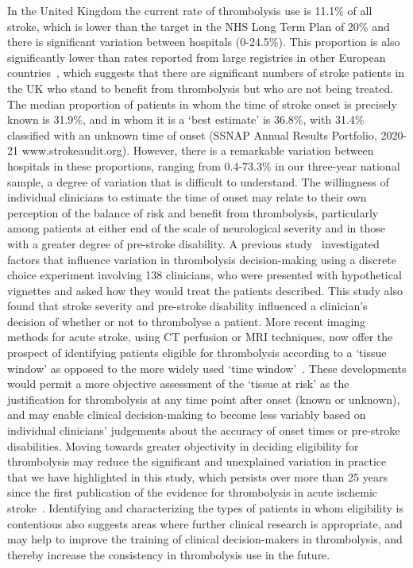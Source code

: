 \documentclass[12pt,a4paper, pdftex]{elsarticle}
\begin{document}
In the United Kingdom the current rate of thrombolysis use is 11.1\% of all stroke, which is lower than the target in the NHS Long Term Plan of 20\% and there is significant variation between hospitals (0-24.5\%).  This proportion is also significantly lower than rates reported from large registries in other European countries~\cite{kuhrij2018dutch}, which suggests that there are significant numbers of stroke patients in the UK who stand to benefit from thrombolysis but who are not being treated. The median proportion of patients in whom the time of stroke onset is precisely known is 31.9\%, and in whom it is a ‘best estimate’ is 36.8\%, with 31.4\% classified with an unknown time of onset (SSNAP Annual Results Portfolio, 2020-21 www.strokeaudit.org). However, there is a remarkable variation between hospitals in these proportions, ranging from  0.4-73.3\% in our three-year national sample, a degree of variation that is difficult to understand.  The willingness of individual clinicians to estimate the time of onset may relate to their own perception of the balance of risk and benefit from thrombolysis, particularly among patients at either end of the scale of neurological severity and in those with a greater degree of pre-stroke disability.  
%
A previous study~\cite{de2018factors} investigated factors that influence variation in thrombolysis decision-making using a discrete choice experiment involving 138 clinicians, who were presented with hypothetical vignettes and asked how they would treat the patients described. This study also found that stroke severity and pre-stroke disability influenced a clinician’s decision of whether or not to thrombolyse a patient. More recent imaging methods for acute stroke, using CT perfusion or MRI techniques, now offer the prospect of identifying patients eligible for thrombolysis according to a ‘tissue window’ as opposed to the more widely used ‘time window’~\cite{thomalla2020intravenous}. These developments would permit a more objective assessment of the ‘tissue at risk’ as the justification for thrombolysis at any time point after onset (known or unknown), and may enable clinical decision-making to become less variably based on individual clinicians’ judgements about the accuracy of onset times or pre-stroke disabilities.  Moving towards greater objectivity in deciding eligibility for thrombolysis may reduce the significant and unexplained variation in practice that we have highlighted in this study, which persists over more than 25 years since the first publication of the evidence for thrombolysis in acute ischemic stroke~\cite{tissue1995national}. Identifying and characterizing the types of patients in whom eligibility is contentious also suggests areas where further clinical research is appropriate, and may help to improve the training of clinical decision-makers in thrombolysis, and thereby increase the consistency in thrombolysis use in the future. 
%
 
\end{document}
